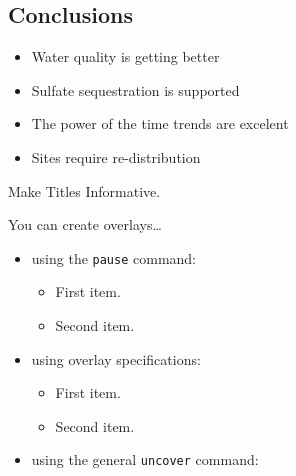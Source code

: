 \documentclass{beamer}
\begin{document}
\begin{frame}	
\section{Conclusions}
\begin{itemize}
	\item Water quality is getting better
	\item Sulfate sequestration is supported
	\item The power of the time trends are excelent
	\item Sites require re-distribution
\end{itemize}
\end{frame}

\begin{frame}
\end{frame}

\begin{frame}{Make Titles Informative.}

  You can create overlays\dots
  \begin{itemize}
  \item using the \texttt{pause} command:
    \begin{itemize}
    \item
      First item.
      \pause
    \item    
      Second item.
    \end{itemize}
  \item
    using overlay specifications:
    \begin{itemize}
    \item<3->
      First item.
    \item<4->
      Second item.
    \end{itemize}
  \item
    using the general \texttt{uncover} command:
    \begin{itemize}
    \end{itemize}
  \end{itemize}
\end{frame}
\end{document}
